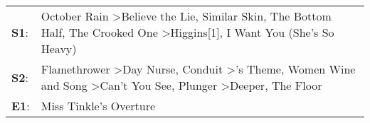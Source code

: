 \begin{supertabular}{p{0.03\textwidth}p{0.92\textwidth}}
 \textbf{S1}:  &                                                                      October Rain\textsuperscript{} \textgreater \enspace Believe the Lie\textsuperscript{}, \enspace Similar Skin\textsuperscript{}, \enspace The Bottom Half\textsuperscript{}, \enspace The Crooked One\textsuperscript{} \textgreater \enspace Higgins[1]\textsuperscript{}, \enspace I Want You (She's So Heavy)\textsuperscript{}  \enspace  \\
 \textbf{S2}:  &  Flamethrower\textsuperscript{} \textgreater \enspace Day Nurse\textsuperscript{}, \enspace Conduit\textsuperscript{} \textgreater {}'s Theme\textsuperscript{}, \enspace Women Wine and Song\textsuperscript{} \textgreater \enspace Can't You See\textsuperscript{}, \enspace Plunger\textsuperscript{} \textgreater \enspace Deeper\textsuperscript{}, \enspace The Floor\textsuperscript{}  \enspace  \\
 \textbf{E1}:  &                                                                                                                                                                                                                                                                                                                                                                Miss Tinkle's Overture\textsuperscript{}  \enspace  \\
\end{supertabular}
